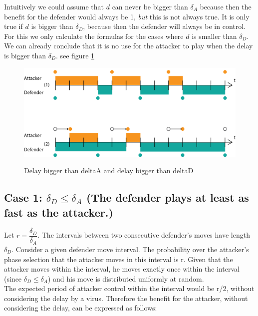 Intuitively we could assume that $d$ can never be bigger than $\delta_{A}$ because then the benefit for the defender would always be 1, \textit{but} this is not always true. It is only true if $d$ is bigger than $\delta_{D}$, because then the defender will always be in control. For this we only calculate the formulas for the cases where $d$ is smaller than $\delta_{D}$. We can already conclude that it is no use for the attacker to play when the delay is bigger than $\delta_{D}$. see figure \ref{delaye}\\ 

\begin{figure}[hbtp]
\caption{Delay bigger than deltaA and delay bigger than deltaD}
\centering
\includegraphics[scale=0.7]{Images/DiffDelayCase1.png}
\label{delaye}
\end{figure}








\subsection*{\textbf{Case 1:} $\delta_{D} \leq \delta_{A} $ (The defender plays at least as fast as the attacker.) }

Let $r = \dfrac{\delta_{D}}{ \delta_{A} }$. The intervals between two consecutive defender's moves have length $\delta_{D}$. Consider a given defender move interval. The probability over the attacker's phase selection that the attacker moves in this interval is r. Given that the attacker moves within the interval, he moves exactly once within the interval (since $\delta_{D} \leq \delta_{A} $) and his move is distributed uniformly at random. \\

The expected period of attacker control within the interval would be r/2, without considering the delay by a virus. Therefore the benefit for the attacker, without considering the delay, can be expressed as follows:

